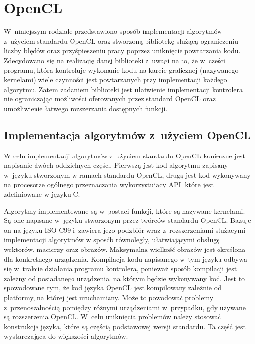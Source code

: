 \chapter{OpenCL}
\label{cha:opencl}

W~niniejszym rodziale przedstawiono sposób implementacji algorytmów z~użyciem standardu OpenCL oraz stworzoną bibliotekę służącą ograniczeniu liczby błędów oraz przyśpieszeniu pracy poprzez uniknięcie powtarzania kodu. Zdecydowano się na realizację danej biblioteki z~uwagi na to, że w~cześci programu, która kontroluje wykonanie kodu na karcie graficznej (nazywanego kernelami) wiele czynności jest powtarzanych przy implementacji każdego algorytmu. Zatem zadaniem biblioteki jest ułatwienie implementacji kontrolera nie ograniczając możliwości oferowanych przez standard OpenCL oraz umożliwienie łatwego rozszerzania dostępnych funkcji.

\section{Implementacja algorytmów z~użyciem OpenCL}  
\label{sec:szczegolyOpenCL}

W celu implementacji algorytmów z~użyciem standardu OpenCL konieczne jest napisanie dwóch oddzielnych części. Pierwszą jest kod algorytmu zapisany w~języku stworzonym w ramach standardu OpenCL, drugą jest kod wykonywany na procesorze ogólnego przeznaczania wykorzystujący API, które jest zdefiniowane w języku C.

Algorytmy implementowane są w~postaci funkcji, które są nazywane kernelami. Są one napisane w~języku stworzonym przez twórców standardu OpenCL. Bazuje on na języku ISO C99 i~zawiera jego podzbiór wraz z~rozszerzeniami służacymi implementacji algorytmów w sposób równoległy, ułatwiającymi obsługę wektorów, macierzy oraz obrazów. Maksymalna wielkość obrazów jest określona dla konkretnego urządzenia. Kompilacja kodu napisanego w~tym języku odbywa się w~trakcie działania programu kontrolera, ponieważ sposób kompilacji jest zależny od posiadanego urządzenia, na którym będzie wykonywany kod. Jest to spowodowane tym, że kod języka OpenCL jest kompilowany zależnie od platformy, na której jest uruchamiany. Może to powodować problemy z~przenoszalnością pomiędzy różnymi urządzeniami w~przypadku, gdy używane są rozszerzenia OpenCL. W~celu uniknięcia problemów należy stosować konstrukcje języka, które są częścią podstawowej wersji standardu. Ta część jest wystarczająca do większości algorytmów.

